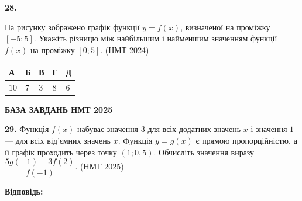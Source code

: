 \documentclass[14pt]{extarticle}
\newcommand{\answerTable}[5]{
\begin{center}
\begin{tabular}{|*{5}{>{\centering\arraybackslash}m{2.8cm}|}}
\hline
\rule[-0.3cm]{0pt}{0.8cm}\textbf{А} & \textbf{Б} & \textbf{В} & \textbf{Г} & \textbf{Д} \\
\hline
\rule[-0.4cm]{0pt}{1.0cm}#1 & \rule[-0.4cm]{0pt}{1.0cm}#2 & \rule[-0.4cm]{0pt}{1.0cm}#3 & \rule[-0.4cm]{0pt}{1.0cm}#4 & \rule[-0.4cm]{0pt}{1.0cm}#5 \\
\hline
\end{tabular}
\end{center}
}
\newcommand{\nmtyear}[1]{\hfill{\small\color{yearcolor}(НМТ #1)}}
\begin{document}
\noindent\textbf{28.} \begin{minipage}[t]{0.55\textwidth}
На рисунку зображено графік функції $y=f(x)$, визначеної на проміжку $[-5; 5]$. Укажіть різницю між найбільшим і найменшим значенням функції $f(x)$ на проміжку $[0; 5]$. \nmtyear{2024}
\end{minipage}
\hfill
\begin{minipage}[t]{0.4\textwidth}
    \vspace{-0.5cm}
    \begin{flushright}
    \end{flushright}
\end{minipage}

\vspace{0.3cm}
\answerTable{$10$}{$7$}{$3$}{$8$}{$6$}

\begin{center}
{\Large\textbf{\color{headerblue}БАЗА ЗАВДАНЬ НМТ 2025}}
\end{center}
\vspace{0.7cm}

\noindent\textbf{29.} Функція $f(x)$ набуває значення $3$ для всіх додатних значень $x$ і значення $1$ — для всіх від'ємних значень $x$. Функція $y=g(x)$ є прямою пропорційністю, а її графік проходить через точку $(1; 0{,}5)$. Обчисліть значення виразу $\dfrac{5g(-1) + 3f(2)}{f(-1)}$. \nmtyear{2025}

\vspace{0.3cm}
\noindent\textbf{Відповідь: \underline{\hspace{3cm}}} 
\end{document}
